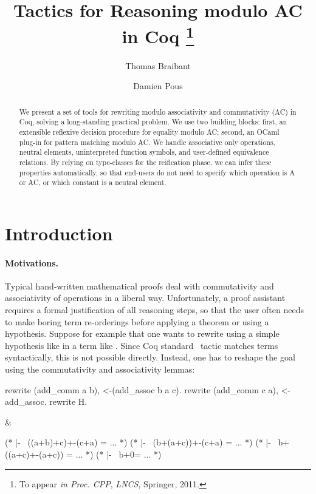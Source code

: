 \documentclass{llncs}
\title{Tactics for Reasoning modulo AC in Coq \thanks{To appear \emph{in Proc. CPP}, \emph{LNCS}, Springer, 2011.}}\author{Thomas Braibant \and Damien Pous} \institute{LIG, UMR 5217, CNRS, INRIA, Grenoble}
\begin{document}
\maketitle

\begin{abstract}
  We present a set of tools for rewriting modulo associativity and
  commutativity (AC) in Coq, solving a long-standing practical
  problem. We use two building blocks: first, an extensible reflexive
  decision procedure for equality modulo AC; second, an OCaml plug-in
  for pattern matching modulo AC.
We handle associative only operations, neutral elements,
  uninterpreted function symbols, and user-defined equivalence
  relations.
By relying on type-classes for the reification phase, we can infer
  these properties automatically, so that end-users do not need to
  specify which operation is A or AC, or which constant is a neutral
  element.
\end{abstract}


\section{Introduction}

\paragraph*{Motivations.}

Typical hand-written mathematical proofs deal with commutativity and
associativity of operations in a liberal way. Unfortunately, a proof
assistant requires a formal justification of all reasoning steps, so
that the user often needs to make boring term re-orderings before
applying a theorem or using a hypothesis.
Suppose for example that one wants to rewrite using a simple
hypothesis like \coqinline in a term like \coqinline. Since Coq standard \rewrite\ tactic matches
terms syntactically, this is not possible directly. Instead, one has
to reshape the goal using the commutativity and associativity lemmas:

\begin{twolistings}
\begin{coq}
\ttab rewrite (add_comm a b), <-(add_assoc b a c).
\ttab rewrite (add_comm c a), <-add_assoc.
\ttab rewrite H. 
\end{coq}&
\begin{coq}
(* |-~ ((a+b)+c)+-(c+a) = ... *)\ttab
(* |-~ (b+(a+c))+-(c+a) = ... *)
(* |-~ b+((a+c)+-(a+c)) = ... *)
(* |-~ b+0\ttab\ttab\ttab\tab= ... *)
\end{coq}
\end{twolistings}
\end{document}
